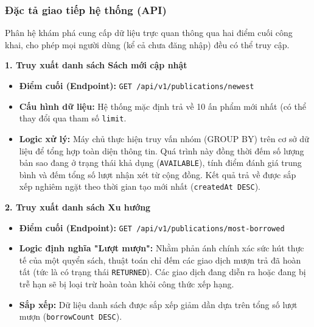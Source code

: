 \vspace{0.5cm}
\subsubsection{Đặc tả giao tiếp hệ thống (API)}

Phân hệ khám phá cung cấp dữ liệu trực quan thông qua hai điểm cuối công khai, cho phép mọi người dùng (kể cả chưa đăng nhập) đều có thể truy cập.

\noindent\textbf{1. Truy xuất danh sách Sách mới cập nhật}
\begin{itemize}
    \item \textbf{Điểm cuối (Endpoint):} \texttt{GET /api/v1/publications/newest} 
    \item \textbf{Cấu hình dữ liệu:} Hệ thống mặc định trả về 10 ấn phẩm mới nhất (có thể thay đổi qua tham số \texttt{limit}.
    \item \textbf{Logic xử lý:} Máy chủ thực hiện truy vấn nhóm (GROUP BY) trên cơ sở dữ liệu để tổng hợp toàn diện thông tin. Quá trình này đồng thời đếm số lượng bản sao đang ở trạng thái khả dụng (\texttt{AVAILABLE}), tính điểm đánh giá trung bình và đếm tổng số lượt nhận xét từ cộng đồng. Kết quả trả về được sắp xếp nghiêm ngặt theo thời gian tạo mới nhất (\texttt{createdAt DESC}).
\end{itemize}

\noindent\textbf{2. Truy xuất danh sách Xu hướng}
\begin{itemize}
    \item \textbf{Điểm cuối (Endpoint):} \texttt{GET /api/v1/publications/most-borrowed} 
    \item \textbf{Logic định nghĩa "Lượt mượn":} Nhằm phản ánh chính xác sức hút thực tế của một quyển sách, thuật toán chỉ đếm các giao dịch mượn trả đã hoàn tất (tức là có trạng thái \texttt{RETURNED}). Các giao dịch đang diễn ra hoặc đang bị trễ hạn sẽ bị loại trừ hoàn toàn khỏi công thức xếp hạng.
    \item \textbf{Sắp xếp:} Dữ liệu danh sách được sắp xếp giảm dần dựa trên tổng số lượt mượn (\texttt{borrowCount DESC}).
\end{itemize}


